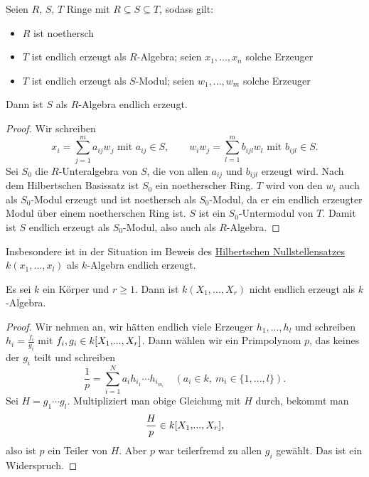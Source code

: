\documentclass[a4paper,12pt,index=toc]{scrbook}
\theoremstyle{keinenummern} %
\renewcommand{\dotsc}{\ensuremath{\!...}}
\newcommand{\polyx}[1][n]{\ensuremath%
  [X_{1},\dotsc,X_{#1}]}
\begin{document}
\begin{lem}\label{1.3.1}
  Seien $R$, $S$, $T$ Ringe mit $R\subseteq S\subseteq T$, sodass gilt:
  \begin{itemize}
  \item $R$ ist noethersch
  \item $T$ ist endlich erzeugt als $R$-Algebra; seien $x_1,\dotsc,x_n$ solche Erzeuger
  \item $T$ ist endlich erzeugt als $S$-Modul; seien $w_1,\dotsc,w_m$ solche Erzeuger
  \end{itemize}
  Dann ist $S$ als $R$-Algebra endlich erzeugt.
\end{lem}
\begin{proof}
  Wir schreiben 
  \begin{equation*} x_i=\displaystyle\sum_{j=1}^m a_{ij}w_j \text{ mit } a_{ij}\in S, \qquad
     w_iw_j=\displaystyle\sum_{l=1}^m b_{ijl}w_l \text { mit } b_{ijl}\in S. \end{equation*}
  Sei $S_0$ die $R$-Unteralgebra von $S$, die von allen $a_{ij}$ und $b_{ijl}$ erzeugt wird. Nach dem Hilbertschen Basissatz ist
  $S_0$ ein noetherscher Ring. $T$ wird von den $w_i$ auch als $S_0$-Modul erzeugt und ist noethersch als $S_0$-Modul, da er ein
  endlich erzeugter Modul über einem noetherschen Ring ist. $S$ ist ein $S_0$-Untermodul von $T$. Damit ist $S$ endlich erzeugt
  als $S_0$-Modul, also auch als $R$-Algebra.
\end{proof}

Insbesondere ist in der Situation im Beweis des \hyperref[HNS]{Hilbertschen Nullstellensatzes} $k(x_1,\dotsc,x_l)$ als
$k$-Algebra endlich erzeugt.

\begin{lem}\label{1.3.2}
  Es sei $k$ ein Körper und $r\ge1$. Dann ist $k(X_1,\dotsc,X_r)$ nicht endlich erzeugt als $k$-Algebra.
\end{lem}
\begin{proof}
  Wir nehmen an, wir hätten endlich viele Erzeuger $h_1,\dotsc,h_l$ und schreiben $h_i=\frac{f_i}{g_i}$ mit $f_i,g_i\in
  k\polyx[r]$. Dann wählen wir ein Primpolynom $p$, das keines der $g_i$ teilt und schreiben
  \begin{equation*} \frac1p = \sum_{i=1}^N a_i h_{i_1}\dotsm h_{i_{m_i}} \quad (a_i\in k,\ m_{i}\in\{1,\dotsc,l\}). \end{equation*}
  Sei $H=g_1\dotsm g_l$. Multipliziert man obige Gleichung mit $H$ durch, bekommt man \begin{equation*}\frac{H}{p}\in k\polyx[r],\end{equation*} also
  ist $p$ ein Teiler von $H$. Aber $p$ war teilerfremd zu allen $g_i$ gewählt. Das ist ein Widerspruch.
\end{proof}
\end{document}
